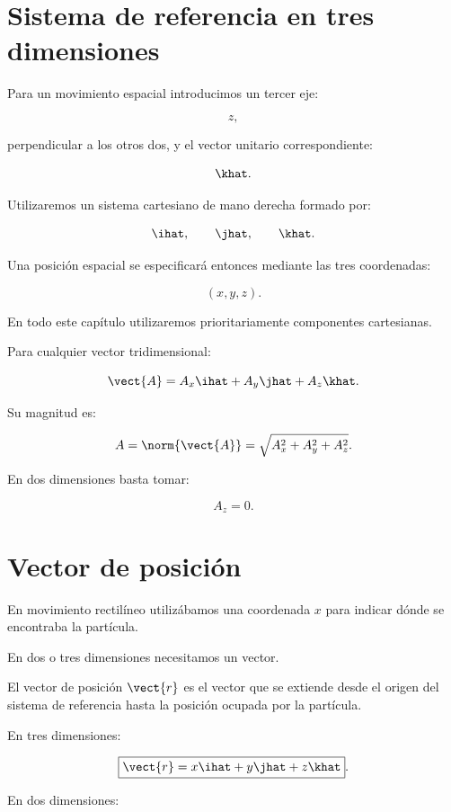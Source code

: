 \section{Sistema de referencia en tres dimensiones}

Para un movimiento espacial introducimos un tercer eje:

\[
z,
\]

perpendicular a los otros dos, y el vector unitario correspondiente:

\[
\khat.
\]

Utilizaremos un sistema cartesiano de mano derecha formado por:

\[
\ihat,
\qquad
\jhat,
\qquad
\khat.
\]

Una posición espacial se especificará entonces mediante las tres coordenadas:

\[
(x,y,z).
\]

\begin{recordatorio}
En todo este capítulo utilizaremos prioritariamente componentes cartesianas.

Para cualquier vector tridimensional:

\[
\vect{A}
=
A_x\ihat+A_y\jhat+A_z\khat.
\]

Su magnitud es:

\[
A
=
\norm{\vect{A}}
=
\sqrt{A_x^2+A_y^2+A_z^2}.
\]

En dos dimensiones basta tomar:

\[
A_z=0.
\]
\end{recordatorio}


\section{Vector de posición}

En movimiento rectilíneo utilizábamos una coordenada \(x\) para indicar dónde se
encontraba la partícula.

En dos o tres dimensiones necesitamos un vector.

\begin{definicion}
El vector de posición \(\vect{r}\) es el vector que se extiende desde el origen
del sistema de referencia hasta la posición ocupada por la partícula.
\end{definicion}

En tres dimensiones:

\[
\boxed{
\vect{r}
=
x\ihat+y\jhat+z\khat
}.
\]

En dos dimensiones:

